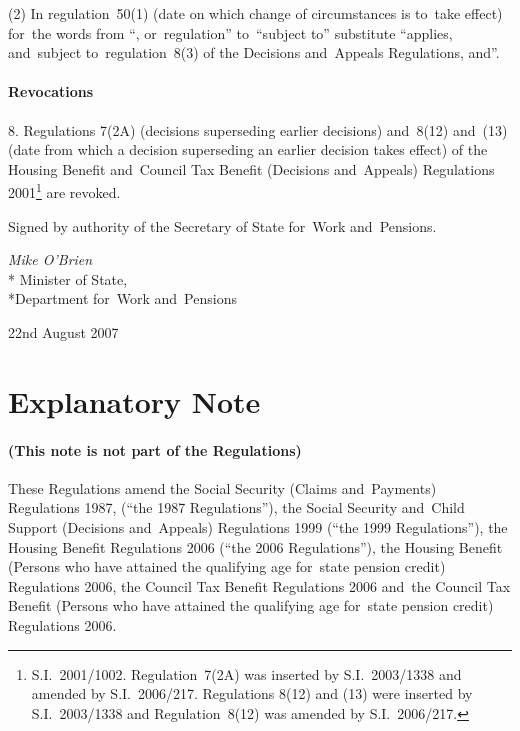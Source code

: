 \documentclass[12pt,a4paper]{article}
\begin{document}
(2) In regulation~50(1) (date on which change of circumstances is to~take effect) for~the words from “, or~regulation” to~“subject to” substitute “applies, and~subject to~regulation~8(3) of the Decisions and~Appeals Regulations, and”.

\subsection[8. Revocations]{Revocations}

8.  Regulations 7(2A) (decisions superseding earlier decisions) and~8(12) and~(13) (date from which a decision superseding an earlier decision takes effect) of the Housing Benefit and~Council Tax Benefit (Decisions and~Appeals) Regulations 2001\footnote{S.I.~2001/1002. Regulation~7(2A) was inserted by S.I.~2003/1338 and amended by S.I.~2006/217. Regulations 8(12) and (13) were inserted by S.I.~2003/1338 and Regulation~8(12) was amended by S.I.~2006/217.} are revoked. 

\pagebreak[3]

\bigskip

Signed 
by authority of the 
Secretary of State for~Work and~Pensions.

{\raggedleft
\emph{Mike O'Brien}\\*
Minister
of State,\\*Department 
for~Work and~Pensions

}

22nd August 2007

\small

\part{Explanatory Note}

\renewcommand\parthead{— Explanatory Note}

\subsection*{(This note is not part of the Regulations)}

These Regulations amend the Social Security (Claims and~Payments) Regulations 1987, (“the 1987 Regulations”), the Social Security and~Child Support (Decisions and~Appeals) Regulations 1999 (“the 1999 Regulations”), the Housing Benefit Regulations 2006 (“the 2006 Regulations”), the Housing Benefit (Persons who have attained the qualifying age for~state pension credit) Regulations 2006, the Council Tax Benefit Regulations 2006 and~the Council Tax Benefit (Persons who have attained the qualifying age for~state pension credit) Regulations 2006.
\end{document}
